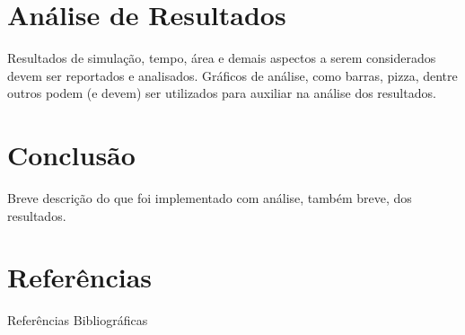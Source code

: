 \documentclass[12pt,openright,oneside,a4paper,english,brazil]{abntex2}
\begin{document}
\chapter*{Análise de Resultados}
Resultados de simulação, tempo, área e demais aspectos a serem considerados devem ser reportados e analisados. Gráficos de análise, como barras, pizza, dentre outros podem (e devem) ser utilizados para auxiliar na análise dos resultados.

\chapter*{Conclusão}
Breve descrição do que foi implementado com análise, também breve, dos resultados.

\chapter*{Referências}
Referências Bibliográficas
\end{document}
